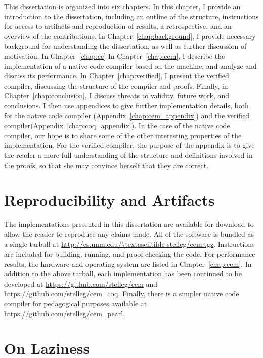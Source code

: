 This dissertation is organized into six chapters. In this chapter, I provide
an introduction to the dissertation, including an outline of the structure,
instructions for access to artifacts and reproduction of results, a
retrospective, and an overview of the contributions. In
Chapter~\ref{chap:background}, I provide necessary background for understanding
the dissertation, as well as further discussion of motivation. In
Chapter~\ref{chap:ce}  In Chapter~\ref{chap:cem}, I describe the implementation
of a native code compiler based on the \ce machine, and analyze and discuss its
performance. In Chapter~\ref{chap:verified}, I present the verified compiler,
discussing the structure of the compiler and proofs. Finally, in
Chapter~\ref{chap:conclusion}, I discuss threats to validity, future work, and
conclusions. I then use appendices to give further implementation details, both
for the native code compiler (Appendix~\ref{chap:cem_appendix}) and the verified
compiler(Appendix~\ref{chap:coq_appendix}). In the case of the native code
compiler, our hope is to share some of the other interesting properties of the
implementation.  For the verified compiler, the purpose of the appendix is to
give the reader a more full understanding of the structure and definitions
involved in the proofs, so that she may convince herself that they are
correct.

\section{Reproducibility and Artifacts}

The implementations presented in this dissertation are available for download to
allow the reader to reproduce any claims made. All of the software is bundled as
a single tarball at \url{http://cs.unm.edu/\textasciitilde stelleg/cem.tgz}.
Instructions are included for building, running, and proof-checking the code.
For performance results, the hardware and operating system are listed in
Chapter~\ref{chap:cem}. In addition to the above tarball, each implementation has been
continued to be developed at \url{https://github.com/stelleg/cem} and
\url{https://github.com/stelleg/cem\_coq}. Finally, there is a simpler native
code compiler for pedagogical purposes available at
\url{https://github.com/stelleg/cem\_pearl}. 

\section{On Laziness}

